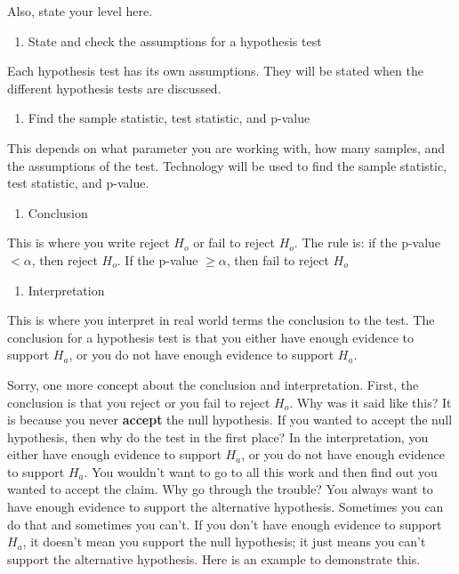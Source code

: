 \documentclass[]{book}
\providecommand{\tightlist}{%
  \setlength{\itemsep}{0pt}\setlength{\parskip}{0pt}}
\begin{document}
Also, state your level here.

\begin{enumerate}
\def\labelenumi{\arabic{enumi}.}
\setcounter{enumi}{2}
\tightlist
\item
  State and check the assumptions for a hypothesis test
\end{enumerate}

Each hypothesis test has its own assumptions. They will be stated when the different hypothesis tests are discussed.

\begin{enumerate}
\def\labelenumi{\arabic{enumi}.}
\setcounter{enumi}{3}
\tightlist
\item
  Find the sample statistic, test statistic, and p-value
\end{enumerate}

This depends on what parameter you are working with, how many samples, and the assumptions of the test. Technology will be used to find the sample statistic, test statistic, and p-value.

\begin{enumerate}
\def\labelenumi{\arabic{enumi}.}
\setcounter{enumi}{4}
\tightlist
\item
  Conclusion
\end{enumerate}

This is where you write reject \(H_o\) or fail to reject \(H_o\). The rule is: if the p-value \(<\alpha\), then reject \(H_o\). If the p-value \(\ge\alpha\), then fail to reject \(H_o\)

\begin{enumerate}
\def\labelenumi{\arabic{enumi}.}
\setcounter{enumi}{5}
\tightlist
\item
  Interpretation
\end{enumerate}

This is where you interpret in real world terms the conclusion to the test. The conclusion for a hypothesis test is that you either have enough evidence to support \(H_a\), or you do not have enough evidence to support \(H_a\).

Sorry, one more concept about the conclusion and interpretation. First, the conclusion is that you reject or you fail to reject \(H_o\). Why was it said like this? It is because you never \textbf{accept} the null hypothesis. If you wanted to accept the null hypothesis, then why do the test in the first place? In the interpretation, you either have enough evidence to support \(H_a\), or you do not have enough evidence to support \(H_a\). You wouldn't want to go to all this work and then find out you wanted to accept the claim. Why go through the trouble? You always want to have enough evidence to support the alternative hypothesis. Sometimes you can do that and sometimes you can't. If you don't have enough evidence to support \(H_a\), it doesn't mean you support the null hypothesis; it just means you can't support the alternative hypothesis. Here is an example to demonstrate this.
\end{document}

